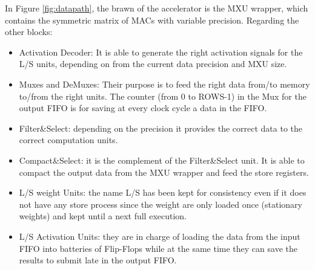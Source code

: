 In Figure \ref{fig:datapath}, the brawn of the accelerator is the MXU wrapper, which contains the symmetric matrix of MACs with variable precision. Regarding the other blocks:
\begin{itemize}
\item Activation Decoder: It is able to generate the right activation signals for the L/S units, depending on from the current data precision and MXU size.
\item Muxes and DeMuxes: Their purpose is to feed the right data from/to memory to/from the right units. The counter (from 0 to ROWS-1) in the Mux for the output FIFO is for saving at every clock cycle a data in the FIFO.
\item Filter\&Select: depending on the precision it provides the correct data to the correct computation units.
\item Compact\&Select: it is the complement of the Filter\&Select unit. It is able to compact the output data from the MXU wrapper and feed the store registers.
\item L/S weight Units: the name L/S has been kept for consistency even if it does not have any store process since the weight are only loaded once (stationary weights) and kept until a next full execution. 
\item L/S Activation Units: they are in charge of loading the data from the input FIFO into batteries of Flip-Flops while at the same time they can save the results to submit late in the output FIFO.
\end{itemize}

